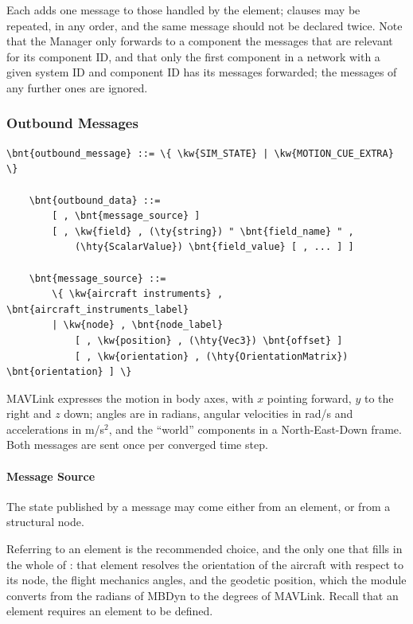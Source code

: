 Each  adds one message to those handled by the element;
clauses may be repeated, in any order, and the same message should not be
declared twice.
Note that the Manager only forwards to a component the messages that are
relevant for its component ID, and that only the first component in a
network with a given system ID and component ID has its messages forwarded;
the messages of any further ones are ignored.

\subsubsection{Outbound Messages}

\begin{Verbatim}[commandchars=\\\{\}]
    \bnt{outbound_message} ::= \{ \kw{SIM_STATE} | \kw{MOTION_CUE_EXTRA} \}

    \bnt{outbound_data} ::=
        [ , \bnt{message_source} ]
        [ , \kw{field} , (\ty{string}) " \bnt{field_name} " ,
            (\hty{ScalarValue}) \bnt{field_value} [ , ... ] ]

    \bnt{message_source} ::=
        \{ \kw{aircraft instruments} , \bnt{aircraft_instruments_label}
        | \kw{node} , \bnt{node_label}
            [ , \kw{position} , (\hty{Vec3}) \bnt{offset} ]
            [ , \kw{orientation} , (\hty{OrientationMatrix}) \bnt{orientation} ] \}
\end{Verbatim}

MAVLink expresses the motion in body axes, with $x$ pointing forward, $y$ to
the right and $z$ down; angles are in radians, angular velocities in rad/s
and accelerations in m/s$^2$, and the ``world'' components in a
North-East-Down frame.
Both messages are sent once per converged time step.

\paragraph{Message Source}
The state published by a message may come either from an
element, or from a structural node.

Referring to an  element is the recommended choice,
and the only one that fills in the whole of : that element
resolves the orientation of the aircraft with respect to its node,
the flight mechanics angles, and the geodetic position, which the module
converts from the radians of MBDyn to the degrees of MAVLink.
Recall that an  element requires an
 element to be defined.

